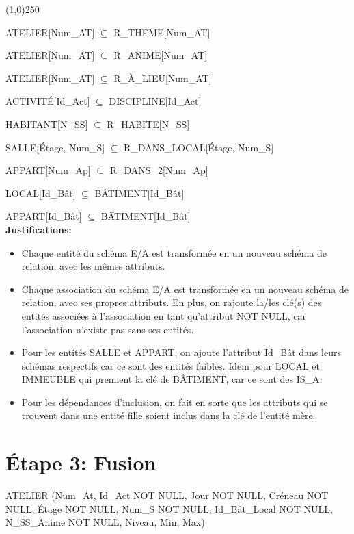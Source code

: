 \documentclass[a4paper,10.5pt]{report}
\begin{document}
	\begin{center}
	\line(1,0){250}
	\end{center}

	ATELIER[Num\_AT] $\subseteq$ R\_THEME[Num\_AT]

	ATELIER[Num\_AT] $\subseteq$ R\_ANIME[Num\_AT]

	ATELIER[Num\_AT] $\subseteq$ R\_À\_LIEU[Num\_AT]

	ACTIVITÉ[Id\_Act] $\subseteq$ DISCIPLINE[Id\_Act]

	HABITANT[N\_SS] $\subseteq$ R\_HABITE[N\_SS]

	SALLE[Étage, Num\_S] $\subseteq$ R\_DANS\_LOCAL[Étage, Num\_S]

	APPART[Num\_Ap] $\subseteq$ R\_DANS\_2[Num\_Ap]

	LOCAL[Id\_Bât] $\subseteq$ BÂTIMENT[Id\_Bât]

	APPART[Id\_Bât] $\subseteq$ BÂTIMENT[Id\_Bât] \\


	\textbf{Justifications: }
	\begin{itemize}
		\item Chaque entité du schéma E/A est transformée en un nouveau schéma de relation, avec les mêmes attributs. 
		\item Chaque association du schéma E/A est transformée en un nouveau schéma de relation, avec ses propres attributs. En plus, on rajoute la/les clé(s) des entités associées à l'association en tant qu'attribut NOT NULL, car l'association n'existe pas sans ses entités.
		\item Pour les entités SALLE et APPART, on ajoute l'attribut Id\_Bât dans leurs schémas respectifs car ce sont des entités faibles. Idem pour LOCAL et IMMEUBLE qui prennent la clé de BÂTIMENT, car ce sont des IS\_A.
		\item Pour les dépendances d'inclusion, on fait en sorte que les attributs qui se trouvent dans une entité fille soient inclus dans la clé de l'entité mère.
	\end{itemize}

    \section*{Étape 3: Fusion}

	ATELIER (\underline{Num\_At}, Id\_Act NOT NULL, Jour NOT NULL, Créneau NOT NULL, Étage NOT NULL, Num\_S NOT NULL, Id\_Bât\_Local NOT NULL, N\_SS\_Anime NOT NULL, Niveau, Min, Max) \\
\end{document}

